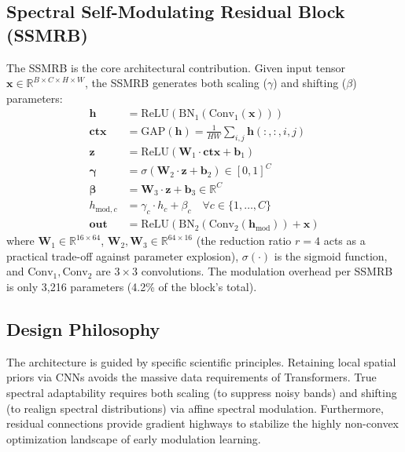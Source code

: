 \documentclass[pdflatex,sn-mathphys-num]{sn-jnl}
\theoremstyle{thmstyleone}
\theoremstyle{thmstyletwo}
\theoremstyle{thmstylethree}
\begin{document}
\subsection{Spectral Self-Modulating Residual Block (SSMRB)}
The SSMRB is the core architectural contribution. Given input tensor $\mathbf{x} \in \mathbb{R}^{B \times C \times H \times W}$, the SSMRB generates both scaling ($\gamma$) and shifting ($\beta$) parameters:
\begin{align}
\mathbf{h} &= \text{ReLU}(\text{BN}_1(\text{Conv}_1(\mathbf{x}))) \label{eq:ssmrb1} \\
\mathbf{ctx} &= \text{GAP}(\mathbf{h}) = \frac{1}{HW} \sum_{i,j} \mathbf{h}(:,:,i,j) \label{eq:ssmrb2} \\
\mathbf{z} &= \text{ReLU}(\mathbf{W}_1 \cdot \mathbf{ctx} + \mathbf{b}_1) \label{eq:ssmrb3} \\
\bm{\gamma} &= \sigma(\mathbf{W}_2 \cdot \mathbf{z} + \mathbf{b}_2) \in [0,1]^C \label{eq:ssmrb4} \\
\bm{\beta} &= \mathbf{W}_3 \cdot \mathbf{z} + \mathbf{b}_3 \in \mathbb{R}^C \label{eq:ssmrb5} \\
h_{\text{mod},c} &= \gamma_c \cdot h_c + \beta_c \quad \forall c \in \{1,\ldots,C\} \label{eq:ssmrb6} \\
\mathbf{out} &= \text{ReLU}(\text{BN}_2(\text{Conv}_2(\mathbf{h}_{\text{mod}})) + \mathbf{x}) \label{eq:ssmrb7}
\end{align}
where $\mathbf{W}_1 \in \mathbb{R}^{16 \times 64}$, $\mathbf{W}_2, \mathbf{W}_3 \in \mathbb{R}^{64 \times 16}$ (the reduction ratio $r=4$ acts as a practical trade-off against parameter explosion), $\sigma(\cdot)$ is the sigmoid function, and $\text{Conv}_1, \text{Conv}_2$ are $3\!\times\!3$ convolutions. The modulation overhead per SSMRB is only 3,216 parameters (4.2\% of the block's total).

\subsection{Design Philosophy}
The architecture is guided by specific scientific principles. Retaining local spatial priors via CNNs avoids the massive data requirements of Transformers. True spectral adaptability requires both scaling (to suppress noisy bands) and shifting (to realign spectral distributions) via affine spectral modulation. Furthermore, residual connections provide gradient highways to stabilize the highly non-convex optimization landscape of early modulation learning.
\end{document}
